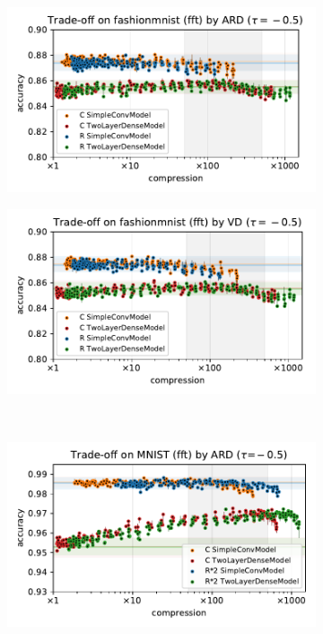 \documentclass[a4paper,10pt,onecolumn]{article}
\begin{document}
\begin{figure}[b]
\begin{subfigure}[b]{0.5\columnwidth}
    \centering
    \includegraphics[width=\columnwidth]{figure__mnist-like__trade-off/appendix__ARD__fashionmnist__fft__-0.5.pdf}
  \end{subfigure}%
  \begin{subfigure}[b]{0.5\columnwidth}
    \centering
    \includegraphics[width=\columnwidth]{figure__mnist-like__trade-off/appendix__VD__fashionmnist__fft__-0.5.pdf}
  \end{subfigure} \\%
  \begin{subfigure}[b]{0.5\columnwidth}
    \centering
    \includegraphics[width=\columnwidth]{figure__mnist-like__trade-off/appendix__cmp__ARD__mnist__fft__-0.5.pdf}

\end{subfigure}
\end{figure}
\end{document}
